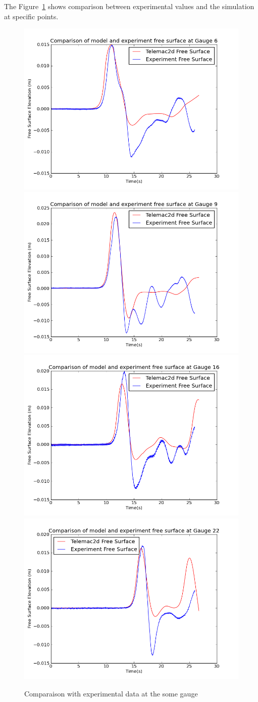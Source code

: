 The Figure~\ref{fig:island:res} shows comparison between experimental values and
the simulation at specific points.
\begin{figure}
  \includegraphics[width=.6\textwidth]{img/gauge6.png}
  \includegraphics[width=.6\textwidth]{img/gauge9.png}
  \includegraphics[width=.6\textwidth]{img/gauge16.png}
  \includegraphics[width=.6\textwidth]{img/gauge22.png}
  \caption{Comparaison with experimental data at the some gauge}\label{fig:island:res}
\end{figure}

